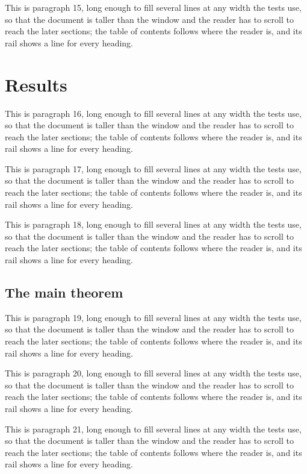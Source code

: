 This is paragraph 15, long enough to fill several lines at any width the tests use, so that the
document is taller than the window and the reader has to scroll to reach the later sections; the
table of contents follows where the reader is, and its rail shows a line for every heading.

\section{Results}
This is paragraph 16, long enough to fill several lines at any width the tests use, so that the
document is taller than the window and the reader has to scroll to reach the later sections; the
table of contents follows where the reader is, and its rail shows a line for every heading.

This is paragraph 17, long enough to fill several lines at any width the tests use, so that the
document is taller than the window and the reader has to scroll to reach the later sections; the
table of contents follows where the reader is, and its rail shows a line for every heading.

This is paragraph 18, long enough to fill several lines at any width the tests use, so that the
document is taller than the window and the reader has to scroll to reach the later sections; the
table of contents follows where the reader is, and its rail shows a line for every heading.

\subsection{The main theorem}
This is paragraph 19, long enough to fill several lines at any width the tests use, so that the
document is taller than the window and the reader has to scroll to reach the later sections; the
table of contents follows where the reader is, and its rail shows a line for every heading.

This is paragraph 20, long enough to fill several lines at any width the tests use, so that the
document is taller than the window and the reader has to scroll to reach the later sections; the
table of contents follows where the reader is, and its rail shows a line for every heading.

This is paragraph 21, long enough to fill several lines at any width the tests use, so that the
document is taller than the window and the reader has to scroll to reach the later sections; the
table of contents follows where the reader is, and its rail shows a line for every heading.

